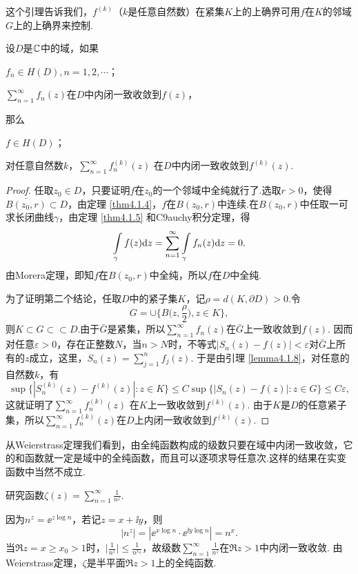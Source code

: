 这个引理告诉我们，$f^{(k)}$（$k$是任意自然数）在紧集$K$上的上确界可用$f$在$K$的邻域$G$上的上确界来控制.
\begin{theorem}\label{thm4.1.9}
设$D$是$\mathbb C$中的域，如果
\begin{eenum}
  \item $f_n\in H(D),n=1,2,\cdots$；
  \item $\sum_{n=1}^\infty f_n(z)$在$D$中内闭一致收敛到$f(z)$，
\end{eenum}
那么
\begin{eenum}
  \item $f\in H(D)$；
  \item 对任意自然数$k$，$\sum_{n=1}^\infty f^{(k)}_n(z)$ 在$D$中内闭一致收敛到$f^{(k)}(z)$.
\end{eenum}
\end{theorem}
\begin{proof}
任取$z_0\in D$，只要证明$f$在$z_0$的一个邻域中全纯就行了.选取$r>0$，使得$\bar{B(z_0,r)}\subset D$，由定理 \ref{thm4.1.4}，$f$在$B(z_0,r)$中连续.在$B(z_0,r)$中任取一可求长闭曲线$\gamma$，由定理 \ref{thm4.1.5} 和C9auchy积分定理，得
\[\int\limits_\gamma f(z)\textrm dz=\sum_{n=1}^\infty \int\limits_\gamma f_n(z)\textrm dz=0.\]
由Morera定理，即知$f$在$B(z_0,r)$中全纯，所以$f$在$D$中全纯.

为了证明第二个结论，任取$D$中的紧子集$K$，记$\rho=d(K,\partial D)>0$.令
\[G=\cup\bigg\{B\bigg(z,\frac\rho2\bigg),z\in K\bigg\},\]
则$K\subset G\subset\subset D$.由于$\bar G$是紧集，所以$\sum_{n=1}^\infty f_n(z)$在$\bar G$上一致收敛到$f(z)$. 因而对任意$\varepsilon>0$，存在正整数$N$，当$n>N$时，不等式$|S_n(z)-f(z)|<\varepsilon$对$\bar G$上所有的$z$成立，这里，$S_n(z)=\sum_{j=1}^nf_j(z)$. 于是由引理 \ref{lemma4.1.8}，对任意的自然数$k$，有
\[\sup\{|S_n^{(k)}(z)-f^{(k)}(z)|:z\in K\}\le C\sup\{|S_n(z)-f(z)|:z\in G\}\le C\varepsilon,\]
这就证明了$\sum_{n=1}^\infty f^{(k)}_n(z)$ 在$K$上一致收敛到$f^{(k)}(z)$. 由于$K$是$D$的任意紧子集，所以$\sum_{n=1}^\infty f_n^{(k)}(z)$在$D$上内闭一致收敛到$f^{(k)}(z)$.
\end{proof}

从Weierstrass定理我们看到，由全纯函数构成的级数只要在域中内闭一致收敛，它的和函数就一定是域中的全纯函数，而且可以逐项求导任意次.这样的结果在实变函数中当然不成立.
\begin{example}\label{exam4.1.10}
研究函数$\zeta(z)=\sum_{n=1}^\infty\frac1{n^z}$.
\end{example}
\begin{solution}
因为$n^z=\ee^{z\log n}$，若记$z=x+\ii y$，则
\[|n^z|=|\ee^{x\log n}\cdot\ee^{\ii y\log n}|=n^x.\]
当$\Re z=x\ge x_0>1$时，$\bigg|\frac1{n^z}\bigg|\le\frac1{n^{x_0}}$，故级数$\sum_{n=1}^\infty\frac1{n^z}$在$\Re z>1$中内闭一致收敛. 由Weierstrass定理，$\zeta$是半平面$\Re z>1$上的全纯函数.
\end{solution}

